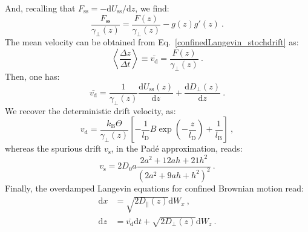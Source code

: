 And, recalling that $F_\mathrm{ss} = -\mathrm{d}U_\mathrm{ss}/\mathrm{d}z$, we find:
\begin{equation}
\dfrac{F_\mathrm{ss}}{\gamma_\perp(z)} = \dfrac{F(z)}{\gamma_\perp(z)} - g(z)g'(z)~.
\end{equation}
The mean velocity can be obtained from Eq.~\ref{confinedLangevin_stochdrift} as:
\begin{equation}
\left<\dfrac{\Delta z}{\Delta t}\right> \equiv \bar{v_\mathrm{d}} = \dfrac{F(z)}{\gamma_\perp(z)}~.
\label{avg_velocity_stochdrift}
\end{equation}
Then, one has:
\begin{equation}
    \bar{v_\mathrm{d}} = \dfrac{1}{\gamma_\perp(z)} \dfrac{\mathrm{d}U_\mathrm{ss}(z)}{\mathrm{d}z} + \dfrac{\mathrm{d}D_\perp(z)}{\mathrm{d}z}~.
\end{equation}
We recover the deterministic drift velocity, as:
\begin{equation}
    \boxed{
v_\mathrm{d} = \dfrac{k_\mathrm{B}\Theta}{\gamma_\perp(z)} \left[-\dfrac{1}{l_\mathrm{D}}B \exp \left(-\dfrac{z}{l_\mathrm{D}}\right) + \dfrac{1}{l_\mathrm{B}} \right]}~,
\end{equation}
whereas the spurious drift $v_\mathrm{s}$, in the Padé approximation, reads:
\begin{equation}
    \boxed{
v_\mathrm{s} = 2D_0a\dfrac{2a^2 + 12 ah + 21 h^2}{(2a^2 + 9ah + h^2)^2}}~.
\label{final_stochastic_drift}
\end{equation}
Finally, the overdamped Langevin equations for confined Brownian motion read:
\begin{align}
    \mathrm{d}x &=  \sqrt{2D_\parallel(z)}\mathrm{d}W_x~,\\
    \mathrm{d}z &= \bar{v_\mathrm{d}}\mathrm{d}t +\sqrt{2D_\perp(z)}\mathrm{d}W_z~.
    \label{Eq:ODconf_langevin}
\end{align} 



